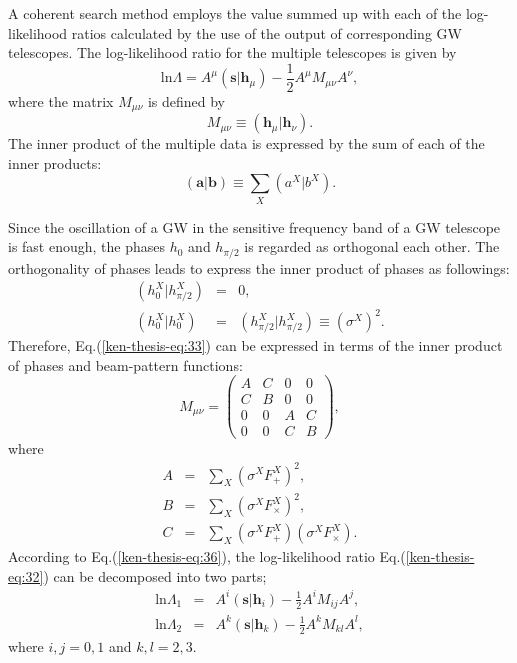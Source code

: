 \documentclass[%
 aps,
 prd,
 amsmath,amssymb,
 reprint,%
superscriptaddress
]{revtex4-1}
\begin{document}
A coherent search method employs the value summed up with each of the log-likelihood ratios calculated by the use of the output of corresponding GW telescopes\cite{PhysRevD.83.084002}. The log-likelihood ratio for the multiple telescopes is given by
\begin{equation}\label{ken-thesis-eq:32}
 \mathrm{ln}\Lambda=A^{\mu}(\bm{s}|\bm{h}_{\mu})-\frac{1}{2}A^{\mu}M_{\mu\nu}A^{\nu},
\end{equation}
where the matrix
$M_{\mu\nu}$ is defined by
\begin{equation}\label{ken-thesis-eq:33}
 M_{\mu\nu}\equiv(\bm{h}_{\mu}|\bm{h}_{\nu}).
\end{equation}
The inner product of the multiple data is expressed by the sum of each of the inner products:
\begin{equation}\label{ken-thesis-eq:31}
 \left(\bm{a}|\bm{b}\right)\equiv \sum_{X}\left(a^{X}|b^{X}\right).
\end{equation}

Since the oscillation of a GW in the sensitive frequency band of a GW telescope is fast enough, the phases
$h_{0}$ and $h_{\pi/2}$ is regarded as orthogonal each other. The orthogonality of phases leads to express the inner product of phases as followings:
\begin{eqnarray}
 \left(h^{X}_{0}|h^{X}_{\pi/2}\right)&=&0,\label{ken-thesis-eq:34}\\
 \left(h^{X}_{0}|h^{X}_{0}\right)&=&\left(h^{X}_{\pi/2}|h^{X}_{\pi/2}\right)\equiv (\sigma^{X})^{2}.\label{ken-thesis-eq:35}
\end{eqnarray}
Therefore, Eq.(\ref{ken-thesis-eq:33}) can be expressed in terms of the inner product of phases and beam-pattern functions:
\begin{equation}\label{ken-thesis-eq:36}
 M_{\mu\nu}=
  \begin{pmatrix}
  A & C & 0& 0 \\
   C & B &0 &0\\
   0&0&A&C\\
   0&0&C&B
  \end{pmatrix},
\end{equation}
where
\begin{eqnarray}
 A&=&\sum_{X}(\sigma^{X}F^{X}_{+})^{2},\label{ken-thesis-eq:37}\\
 B&=&\sum_{X}(\sigma^{X}F^{X}_{\times})^{2},\label{ken-thesis-eq:38}\\
 C&=&\sum_{X}(\sigma^{X}F^{X}_{+})(\sigma^{X}F^{X}_{\times}).\label{ken-thesis-eq:39}
\end{eqnarray}
According to Eq.(\ref{ken-thesis-eq:36}), the log-likelihood ratio Eq.(\ref{ken-thesis-eq:32}) can be decomposed into two parts;
\begin{eqnarray}
 \mathrm{ln}\Lambda_{1}&=&A^{i}(\bm{s}|\bm{h}_{i})-\frac{1}{2}A^{i}M_{ij}A^{j},\label{ken-thesis-eq:41}\\
 \mathrm{ln}\Lambda_{2}&=&A^{k}(\bm{s}|\bm{h}_{k})-\frac{1}{2}A^{k}M_{kl}A^{l},\label{ken-thesis-eq:42}
\end{eqnarray}
where
$i,j=0,1$ and
$k,l=2,3$.
\end{document}
